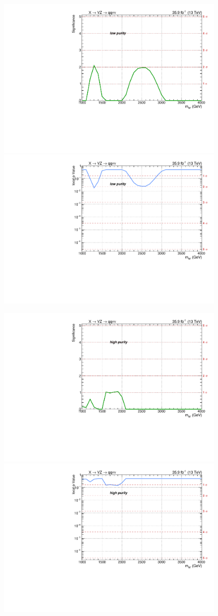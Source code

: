 \begin{figure}[!htb]
  \begin{center}
     \includegraphics[width=.495\textwidth]{plotsAlpha_tesi/Limits/Significance_XWZInv_XVZnnlp.pdf}%
     \includegraphics[width=.495\textwidth]{plotsAlpha_tesi/Limits/pValue_XWZInv_XVZnnlp.pdf}

     \includegraphics[width=.495\textwidth]{plotsAlpha_tesi/Limits/Significance_XWZInv_XVZnnhp.pdf}%
     \includegraphics[width=.495\textwidth]{plotsAlpha_tesi/Limits/pValue_XWZInv_XVZnnhp.pdf}


\end{center}
\end{figure}
